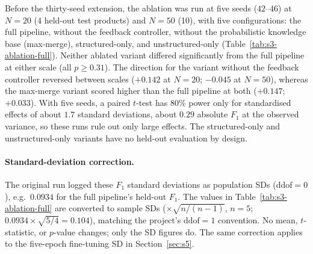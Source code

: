 \documentclass[11pt]{article}
\begin{document}
Before the thirty-seed extension, the ablation was run at five seeds
($42$--$46$) at $N=20$ (4 held-out test products) and $N=50$ (10), with
five configurations: the full pipeline, without the feedback controller,
without the probabilistic knowledge base (max-merge), structured-only,
and unstructured-only (Table~\ref{tab:s3-ablation-full}). Neither
ablated variant differed significantly from the full pipeline at either
scale (all $p \ge 0.31$). The direction for the variant without the
feedback controller reversed between scales ($+0.142$ at $N=20$;
$-0.045$ at $N=50$), whereas the max-merge variant scored higher than
the full pipeline at both ($+0.147$; $+0.033$). With five seeds, a paired
$t$-test has 80\% power only for standardised effects of about $1.7$
standard deviations, about $0.29$ absolute $F_1$ at the observed
variance, so these runs rule out only large effects. The structured-only
and unstructured-only variants have no held-out evaluation by design.

\paragraph{Standard-deviation correction.} The original run logged these $F_1$
standard deviations as population SDs ($\text{ddof}=0$), e.g.\ $0.0934$
for the full pipeline's held-out $F_1$. The values in
Table~\ref{tab:s3-ablation-full} are converted to sample SDs
($\times\sqrt{n/(n-1)}$, $n=5$; $0.0934 \times \sqrt{5/4} = 0.104$),
matching the project's $\text{ddof}=1$ convention. No mean,
$t$-statistic, or $p$-value changes; only the SD figures do. The same
correction applies to the five-epoch fine-tuning SD in
Section~\ref{sec:s5}.
\end{document}
